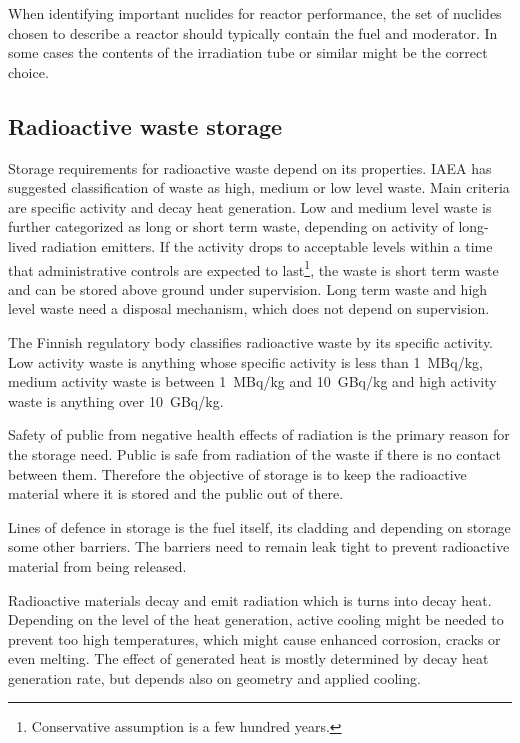 When identifying important nuclides for reactor performance, the set of nuclides chosen to describe a reactor should typically contain the fuel and moderator. In some cases the contents of the irradiation tube or similar might be the correct choice. 



\subsection{Radioactive waste storage}

Storage requirements for radioactive waste depend on its properties. IAEA has suggested classification of waste as high, medium or low level waste. Main criteria are specific activity and decay heat generation. Low and medium level waste is further categorized as long or short term waste, depending on activity of long-lived radiation emitters. If the activity drops to acceptable levels within a time that administrative controls are expected to last\footnote{Conservative assumption is a few hundred years.}, the waste is short term waste and can be stored above ground under supervision. Long term waste and high level waste need a disposal mechanism, which does not depend on supervision.~\cite{iaea_safety_series_950}

The Finnish regulatory body classifies radioactive waste by its specific activity. Low activity waste is anything whose specific activity is less than \SI{1}{MBq/kg}, medium activity waste is between \SI{1}{MBq/kg} and \SI{10}{GBq/kg} and high activity waste is anything over \SI{10}{GBq/kg}.~\cite{stuk_jate_matala_keski, stuk_jate_korkea}

Safety of public from negative health effects of radiation is the primary reason for the storage need. Public is safe from radiation of the waste if there is no contact between them. Therefore the objective of storage is to keep the radioactive material where it is stored and the public out of there.

Lines of defence in storage is the fuel itself, its cladding and depending on storage some other barriers. The barriers need to remain leak tight to prevent radioactive material from being released.

Radioactive materials decay and emit radiation which is turns into decay heat. Depending on the level of the heat generation, active cooling might be needed to prevent too high temperatures, which might cause enhanced corrosion, cracks or even melting. The effect of generated heat is mostly determined by decay heat generation rate, but depends also on geometry and applied cooling.

